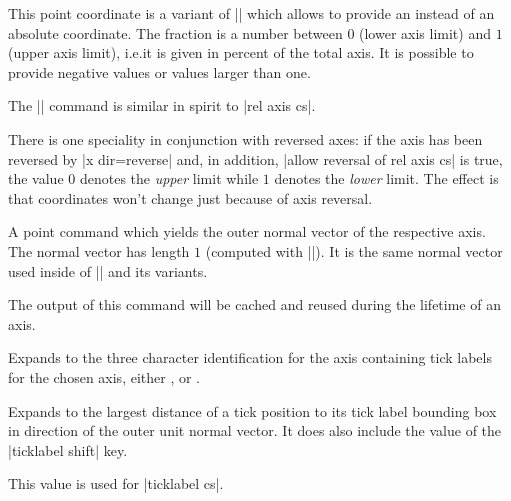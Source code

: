 \begin{command}{\pgfplotsqpointoutsideofaxisrel%
}
    This point coordinate is a variant of |\pgfplotsqpointoutsideofaxis| which
    allows to provide an  instead of an absolute
    coordinate. The fraction is a number between $0$ (lower axis limit) and $1$
    (upper axis limit), i.e.\@ it is given in percent of the total axis. It is
    possible to provide negative values or values larger than one.

    The |\pgfplotsqpointoutsideofaxisrel| command is similar in spirit to
    |rel axis cs|.

    There is one speciality in conjunction with reversed axes: if the axis has
    been reversed by |x dir=reverse| and, in addition,
    |allow reversal of rel axis cs| is true, the value $0$ denotes the
    \emph{upper} limit while $1$ denotes the \emph{lower} limit. The effect is
    that coordinates won't change just because of axis reversal.
\end{command}

\begin{command}{\pgfplotspointouternormalvectorofaxis{}}
    A point command which yields the outer normal vector of the respective
    axis. The normal vector has length $1$ (computed with
    |\pgfpointnormalised|). It is the same normal vector used inside of
    |\pgfplotsqpointoutsideofaxis| and its variants.

    The output of this command will be cached and reused during the lifetime
    of an axis.
\end{command}

\begin{command}{\pgfplotsticklabelaxisspec{}}
    Expands to the three character identification for the axis containing tick
    labels for the chosen axis, either ,  or .
\end{command}

\begin{command}{\pgfplotsvalueoflargesttickdimen{}}
    Expands to the largest distance of a tick position to its tick label
    bounding box in direction of the outer unit normal vector. It does also
    include the value of the |ticklabel shift| key.

    This value is used for |ticklabel cs|.
\end{command}

